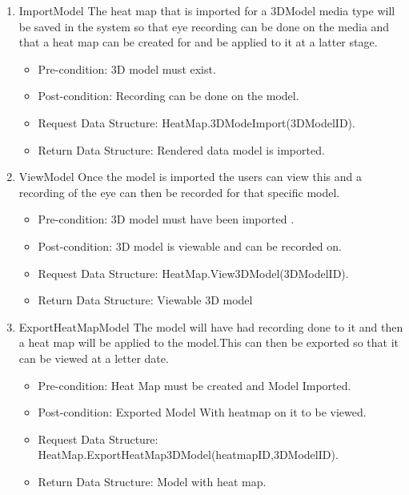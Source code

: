 \begin{enumerate}
\item{ImportModel}
\newline
The heat map that is imported for a 3DModel media type will be saved in the system so that eye recording can be done on the media and that a heat map can be created for and be applied to it at a latter stage.
\begin{itemize}
\item Pre-condition: 3D model must exist.
\item Post-condition: Recording can be done on the model.
\item Request Data Structure: HeatMap.3DModeImport(3DModelID).
\item Return Data Structure: Rendered data model is imported.
\end{itemize}

\item{ViewModel}
Once the model is imported the users can view this and a recording of the eye can then be recorded for that specific model.
\begin{itemize}
\item Pre-condition: 3D model must have been imported .
\item Post-condition: 3D model is viewable and can be recorded on.
\item Request Data Structure: HeatMap.View3DModel(3DModelID).
\item Return Data Structure: Viewable 3D model
\end{itemize}

\item{ExportHeatMapModel}
The model will have had recording done to it and then a heat map will be applied to the model.This can then be exported so that it can be viewed at a letter date. 
\begin{itemize}
\item Pre-condition: Heat Map must be created and Model Imported.
\item Post-condition: Exported Model With heatmap on it to be viewed.
\item Request Data Structure: HeatMap.ExportHeatMap3DModel(heatmapID,3DModelID).
\item Return Data Structure: Model with heat map.
\end{itemize}

\end{enumerate}

